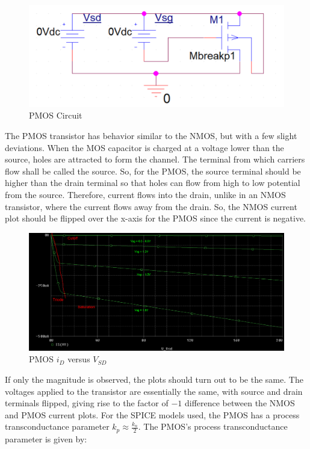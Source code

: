 \FloatBarrier

\begin{figure}[h!]
	\centering
	\includegraphics[scale=0.5]{./images/circuit2.PNG}
	\caption{PMOS Circuit}
	\label{fig:circuit2}
\end{figure}

\FloatBarrier

The PMOS transistor has behavior similar to the NMOS, but with a few slight deviations. When the MOS capacitor is charged at a voltage lower than the source, holes are attracted to form the channel. The terminal from which carriers flow shall be called the source. So, for the PMOS, the source terminal should be higher than the drain terminal so that holes can flow from high to low potential from the source. Therefore, current flows into the drain, unlike in an NMOS transistor, where the current flows away from the drain. So, the NMOS current plot should be flipped over the x-axis for the PMOS since the current is negative.

\FloatBarrier

\begin{figure}[h!]
	\centering
	\includegraphics[scale=0.25]{./images/circuit2_vsd_sweep.PNG}
	\caption{PMOS $i_{D}$ versus $V_{SD}$}
	\label{fig:circuit2_vsd_sweep}
\end{figure}

\FloatBarrier

If only the magnitude is observed, the plots should turn out to be the same. The voltages applied to the transistor are essentially the same, with source and drain terminals flipped, giving rise to the factor of $-1$ difference between the NMOS and PMOS current plots. For the SPICE models used, the PMOS has a process transconductance parameter $k_p \approx \frac{k_n}{2}$. The PMOS's process transconductance parameter is given by:

